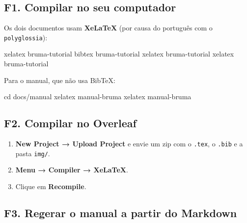 \documentclass[
  10pt,
]{article}
\newenvironment{Shaded}{\begin{snugshade}}{\end{snugshade}}
\newcommand{\BuiltInTok}[1]{#1}
\newcommand{\ExtensionTok}[1]{#1}
\newcommand{\NormalTok}[1]{#1}
\providecommand{\tightlist}{%
  \setlength{\itemsep}{0pt}\setlength{\parskip}{0pt}}
\begin{document}
\hypertarget{f1.-compilar-no-seu-computador}{%
\subsection{F1. Compilar no seu
computador}\label{f1.-compilar-no-seu-computador}}

Os dois documentos usam \textbf{XeLaTeX} (por causa do português com o
\texttt{polyglossia}):

\begin{Shaded}
\begin{Highlighting}[]
\ExtensionTok{xelatex}\NormalTok{ bruma{-}tutorial}
\ExtensionTok{bibtex}\NormalTok{  bruma{-}tutorial}
\ExtensionTok{xelatex}\NormalTok{ bruma{-}tutorial}
\ExtensionTok{xelatex}\NormalTok{ bruma{-}tutorial}
\end{Highlighting}
\end{Shaded}

Para o manual, que não usa BibTeX:

\begin{Shaded}
\begin{Highlighting}[]
\BuiltInTok{cd}\NormalTok{ docs/manual}
\ExtensionTok{xelatex}\NormalTok{ manual{-}bruma}
\ExtensionTok{xelatex}\NormalTok{ manual{-}bruma}
\end{Highlighting}
\end{Shaded}

\hypertarget{f2.-compilar-no-overleaf}{%
\subsection{F2. Compilar no Overleaf}\label{f2.-compilar-no-overleaf}}

\begin{enumerate}
\def\labelenumi{\arabic{enumi}.}
\tightlist
\item
  \textbf{New Project → Upload Project} e envie um zip com o
  \texttt{.\allowbreak{}tex}, o \texttt{.\allowbreak{}bib} e a pasta
  \texttt{img/\allowbreak{}}.
\item
  \textbf{Menu → Compiler → XeLaTeX}.
\item
  Clique em \textbf{Recompile}.
\end{enumerate}

\hypertarget{f3.-regerar-o-manual-a-partir-do-markdown}{%
\subsection{F3. Regerar o manual a partir do
Markdown}\label{f3.-regerar-o-manual-a-partir-do-markdown}}
\end{document}
